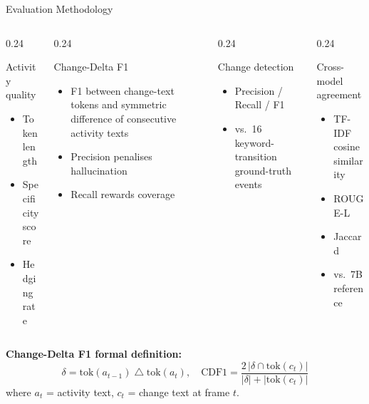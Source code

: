 \documentclass[10pt, aspectratio=169]{beamer}
\begin{document}
\begin{frame}{Evaluation Methodology}
  \begin{columns}[T]
    \begin{column}{0.24\textwidth}
      \begin{block}{Activity quality}
        \begin{itemize}\small
          \item Token length
          \item Specificity score
          \item Hedging rate
        \end{itemize}
      \end{block}
    \end{column}
    \begin{column}{0.24\textwidth}
      \begin{block}{Change-Delta F1}
        \begin{itemize}\small
          \item F1 between change-text tokens and symmetric difference of consecutive activity texts
          \item Precision penalises hallucination
          \item Recall rewards coverage
        \end{itemize}
      \end{block}
    \end{column}
    \begin{column}{0.24\textwidth}
      \begin{block}{Change detection}
        \begin{itemize}\small
          \item Precision / Recall / F1
          \item vs.\ 16 keyword-transition ground-truth events
        \end{itemize}
      \end{block}
    \end{column}
    \begin{column}{0.24\textwidth}
      \begin{block}{Cross-model agreement}
        \begin{itemize}\small
          \item TF-IDF cosine similarity
          \item ROUGE-L
          \item Jaccard
          \item vs.\ 7B reference
        \end{itemize}
      \end{block}
    \end{column}
  \end{columns}

  \vspace{0.8em}
  \small
  \textbf{Change-Delta F1 formal definition:}
  \[
    \delta = \mathrm{tok}(a_{t-1}) \mathbin{\triangle} \mathrm{tok}(a_t),\quad
    \mathrm{CDF1} = \frac{2\,|\delta \cap \mathrm{tok}(c_t)|}{|\delta| + |\mathrm{tok}(c_t)|}
  \]
  where $a_t$ = activity text, $c_t$ = change text at frame $t$.
\end{frame}
\end{document}
